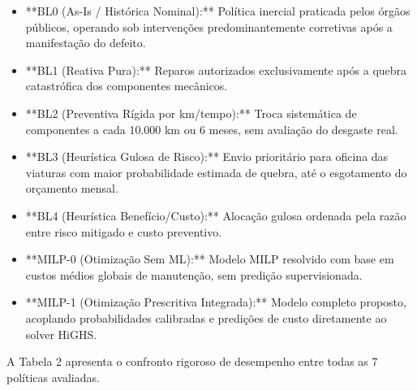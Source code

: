 \documentclass[10pt,a4paper,journal]{article}
\begin{document}
\begin{itemize}
\item **BL0 (As-Is / Histórica Nominal):** Política inercial praticada pelos órgãos públicos, operando sob intervenções predominantemente corretivas após a manifestação do defeito.
\end{itemize}
\begin{itemize}
\item **BL1 (Reativa Pura):** Reparos autorizados exclusivamente após a quebra catastrófica dos componentes mecânicos.
\end{itemize}
\begin{itemize}
\item **BL2 (Preventiva Rígida por km/tempo):** Troca sistemática de componentes a cada 10.000 km ou 6 meses, sem avaliação do desgaste real.
\end{itemize}
\begin{itemize}
\item **BL3 (Heurística Gulosa de Risco):** Envio prioritário para oficina das viaturas com maior probabilidade estimada de quebra, até o esgotamento do orçamento mensal.
\end{itemize}
\begin{itemize}
\item **BL4 (Heurística Benefício/Custo):** Alocação gulosa ordenada pela razão entre risco mitigado e custo preventivo.
\end{itemize}
\begin{itemize}
\item **MILP-0 (Otimização Sem ML):** Modelo MILP resolvido com base em custos médios globais de manutenção, sem predição supervisionada.
\end{itemize}
\begin{itemize}
\item **MILP-1 (Otimização Prescritiva Integrada):** Modelo completo proposto, acoplando probabilidades calibradas e predições de custo diretamente ao solver HiGHS.
\end{itemize}
A Tabela 2 apresenta o confronto rigoroso de desempenho entre todas as 7 políticas avaliadas.
\end{document}
